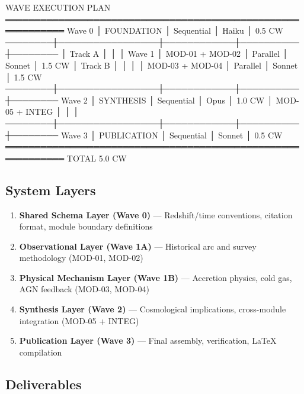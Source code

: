 \documentclass[11pt,letterpaper]{article}
\begin{document}
\begin{asciibox}
WAVE EXECUTION PLAN
════════════════════════════════════════════════════════════
 Wave 0 │ FOUNDATION      │ Sequential │ Haiku    │ 0.5 CW
────────┼─────────────────┼────────────┼──────────┼────────
        │ Track A         │            │          │
 Wave 1 │ MOD-01 + MOD-02 │ Parallel   │ Sonnet   │ 1.5 CW
        │ Track B         │            │          │
        │ MOD-03 + MOD-04 │ Parallel   │ Sonnet   │ 1.5 CW
────────┼─────────────────┼────────────┼──────────┼────────
 Wave 2 │ SYNTHESIS       │ Sequential │ Opus     │ 1.0 CW
        │ MOD-05 + INTEG  │            │          │
────────┼─────────────────┼────────────┼──────────┼────────
 Wave 3 │ PUBLICATION     │ Sequential │ Sonnet   │ 0.5 CW
════════════════════════════════════════════════════════════
 TOTAL                                           5.0 CW
\end{asciibox}

\subsection{System Layers}

\begin{enumerate}
  \item \textbf{Shared Schema Layer (Wave 0)} --- Redshift/time conventions, citation format, module boundary definitions
  \item \textbf{Observational Layer (Wave 1A)} --- Historical arc and survey methodology (MOD-01, MOD-02)
  \item \textbf{Physical Mechanism Layer (Wave 1B)} --- Accretion physics, cold gas, AGN feedback (MOD-03, MOD-04)
  \item \textbf{Synthesis Layer (Wave 2)} --- Cosmological implications, cross-module integration (MOD-05 + INTEG)
  \item \textbf{Publication Layer (Wave 3)} --- Final assembly, verification, LaTeX compilation
\end{enumerate}

\subsection{Deliverables}
\end{document}
